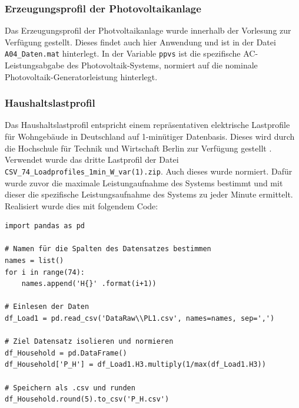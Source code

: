 \subsubsection{Erzeugungsprofil der Photovoltaikanlage}

Das Erzeugungsprofil der Photvoltaikanlage wurde innerhalb der Vorlesung zur Verfügung gestellt. Dieses findet auch hier Anwendung und ist in der Datei \texttt{A04\_Daten.mat} hinterlegt. In der Variable \texttt{ppvs} ist die spezifische AC-Leistungsabgabe des Photovoltaik-Systems, normiert auf die nominale Photovoltaik-Generatorleistung hinterlegt.

\subsubsection{Haushaltslastprofil}

Das Haushaltslastprofil entspricht einem repräsentativen elektrische Lastprofile für Wohngebäude in Deutschland auf 1-minütiger Datenbasis. Dieses wird durch die Hochschule für Technik und Wirtschaft Berlin zur Verfügung gestellt \parencite{htwLast18}.\\
Verwendet wurde das dritte Lastprofil der Datei \texttt{CSV\_74\_Loadprofiles\_1min\_W\_var(1).zip}. Auch dieses wurde normiert. Dafür wurde zuvor die maximale Leistungaufnahme des Systems bestimmt und mit dieser die spezifische Leistungsaufnahme des Systems zu jeder Minute ermittelt.\medskip\\
Realisiert wurde dies mit folgendem Code:


\begin{code}
\label{code:household}
\begin{verbatim}
import pandas as pd

# Namen für die Spalten des Datensatzes bestimmen
names = list()
for i in range(74):
    names.append('H{}' .format(i+1))
    
# Einlesen der Daten
df_Load1 = pd.read_csv('DataRaw\\PL1.csv', names=names, sep=',')

# Ziel Datensatz isolieren und normieren
df_Household = pd.DataFrame()
df_Household['P_H'] = df_Load1.H3.multiply(1/max(df_Load1.H3))

# Speichern als .csv und runden
df_Household.round(5).to_csv('P_H.csv')
\end{verbatim}
\end{code}


